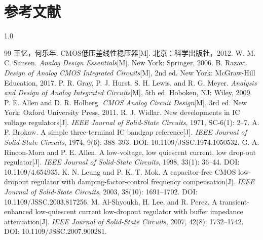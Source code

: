 \documentclass[a4paper, 12pt]{article}
\begin{document}
\section*{参考文献}
\begin{spacing}{1.0}
\begin{thebibliography}{99}
   王忆，何乐年. CMOS低压差线性稳压器[M]. 北京：科学出版社，2012.
   W. M. C. Sansen. \textit{Analog Design Essentials}[M]. New York: Springer, 2006.
   B. Razavi. \textit{Design of Analog CMOS Integrated Circuits}[M], 2nd ed. New York: McGraw-Hill Education, 2017.
   P. R. Gray, P. J. Hurst, S. H. Lewis, and R. G. Meyer. \textit{Analysis and Design of Analog Integrated Circuits}[M], 5th ed. Hoboken, NJ: Wiley, 2009.
   P. E. Allen and D. R. Holberg. \textit{CMOS Analog Circuit Design}[M], 3rd ed. New York: Oxford University Press, 2011.
   R. J. Widlar. New developments in IC voltage regulators[J]. \textit{IEEE Journal of Solid-State Circuits}, 1971, SC-6(1): 2--7.
   A. P. Brokaw. A simple three-terminal IC bandgap reference[J]. \textit{IEEE Journal of Solid-State Circuits}, 1974, 9(6): 388--393. DOI: 10.1109/JSSC.1974.1050532.
   G. A. Rincon-Mora and P. E. Allen. A low-voltage, low quiescent current, low drop-out regulator[J]. \textit{IEEE Journal of Solid-State Circuits}, 1998, 33(1): 36--44. DOI: 10.1109/4.654935.
   K. N. Leung and P. K. T. Mok. A capacitor-free CMOS low-dropout regulator with damping-factor-control frequency compensation[J]. \textit{IEEE Journal of Solid-State Circuits}, 2003, 38(10): 1691--1702. DOI: 10.1109/JSSC.2003.817256.
   M. Al-Shyoukh, H. Lee, and R. Perez. A transient-enhanced low-quiescent current low-dropout regulator with buffer impedance attenuation[J]. \textit{IEEE Journal of Solid-State Circuits}, 2007, 42(8): 1732--1742. DOI: 10.1109/JSSC.2007.900281.
\end{thebibliography}
\end{spacing}

\end{document}
